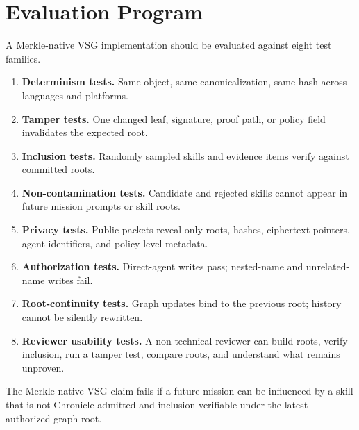 \documentclass[11pt,letterpaper]{article}
\begin{document}
\section{Evaluation Program}
A Merkle-native VSG implementation should be evaluated against eight test families.
\begin{enumerate}
\item \textbf{Determinism tests.} Same object, same canonicalization, same hash across languages and platforms.
\item \textbf{Tamper tests.} One changed leaf, signature, proof path, or policy field invalidates the expected root.
\item \textbf{Inclusion tests.} Randomly sampled skills and evidence items verify against committed roots.
\item \textbf{Non-contamination tests.} Candidate and rejected skills cannot appear in future mission prompts or skill roots.
\item \textbf{Privacy tests.} Public packets reveal only roots, hashes, ciphertext pointers, agent identifiers, and policy-level metadata.
\item \textbf{Authorization tests.} Direct-agent writes pass; nested-name and unrelated-name writes fail.
\item \textbf{Root-continuity tests.} Graph updates bind to the previous root; history cannot be silently rewritten.
\item \textbf{Reviewer usability tests.} A non-technical reviewer can build roots, verify inclusion, run a tamper test, compare roots, and understand what remains unproven.
\end{enumerate}

\begin{redbox}
The Merkle-native VSG claim fails if a future mission can be influenced by a skill that is not Chronicle-admitted and inclusion-verifiable under the latest authorized graph root.
\end{redbox}
\end{document}
